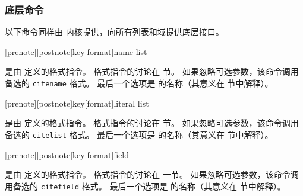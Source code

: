 \subsubsection{底层命令}%
\label{use:cit:low}

以下命令同样由 \biblatex 内核提供，向所有列表和域提供底层接口。

\begin{ltxsyntax}

[prenote][postnote]{key}[format]{name list}


 是由  定义的格式指令。
格式指令的讨论在  节。
如果忽略可选参数，该命令调用备选的 \texttt{citename} 格式。
最后一个选项是  的名称（其意义在  节中解释）。

[prenote][postnote]{key}[format]{literal list}


 是由  定义的格式指令。
格式指令的讨论在  节。
如果忽略可选参数，该命令调用备选的 \texttt{citelist} 格式。
最后一个选项是  的名称（其意义在  节中解释）。

[prenote][postnote]{key}[format]{field}


 是由  定义的格式指令。
格式指令的讨论在  一节。
如果忽略可选参数，该命令调用备选的 \texttt{citefield} 格式。
最后一个选项是  的名称（其意义在  节中解释）。

\end{ltxsyntax}

